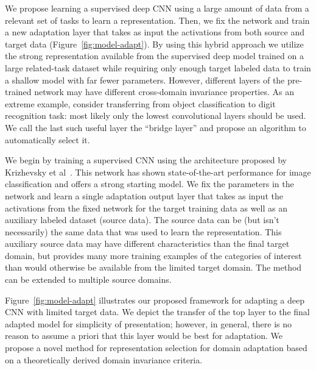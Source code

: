 
We propose learning a supervised deep CNN using a large amount of
data from a relevant set of tasks to learn a representation. Then, we fix the network and train a new adaptation layer
that takes as input the activations from both source and target data (Figure~\ref{fig:model-adapt}). By
using this hybrid approach we utilize the strong representation available from
the supervised deep model trained on a large related-task dataset while requiring only
enough target labeled data to train a shallow model with far fewer parameters.
However, different layers of the pre-trained network may have different cross-domain invariance properties. As an extreme example, consider transferring from object classification to digit recognition task: most likely only the lowest convolutional layers should be used. We call the last such useful layer the ``bridge layer'' and propose an algorithm to automatically select it.


We begin by training a supervised CNN using the architecture proposed by 
Krizhevsky et al~\cite{supervision}. This network has shown state-of-the-art
performance for image classification and offers a strong starting model.
We fix the 
parameters in the
network and learn a single adaptation output layer that takes as input
the activations from the fixed network for the target training data as well as an auxiliary labeled
dataset (source data). The source data
can be (but isn't necessarily) the same data that was used to learn the representation.
This auxiliary source data may have different characteristics than the final target domain, but
provides many more training examples of the categories of interest than would otherwise be available from the limited target domain. The method can be extended to multiple source domains.

Figure~\ref{fig:model-adapt} illustrates our proposed framework for adapting a deep CNN with limited target data.
We depict the transfer of the top layer to the final adapted model for simplicity of presentation; however, in general, there is no reason to assume a priori that this layer would be best for adaptation.
We propose a novel method for representation selection for domain adaptation based on a theoretically derived domain invariance criteria.


